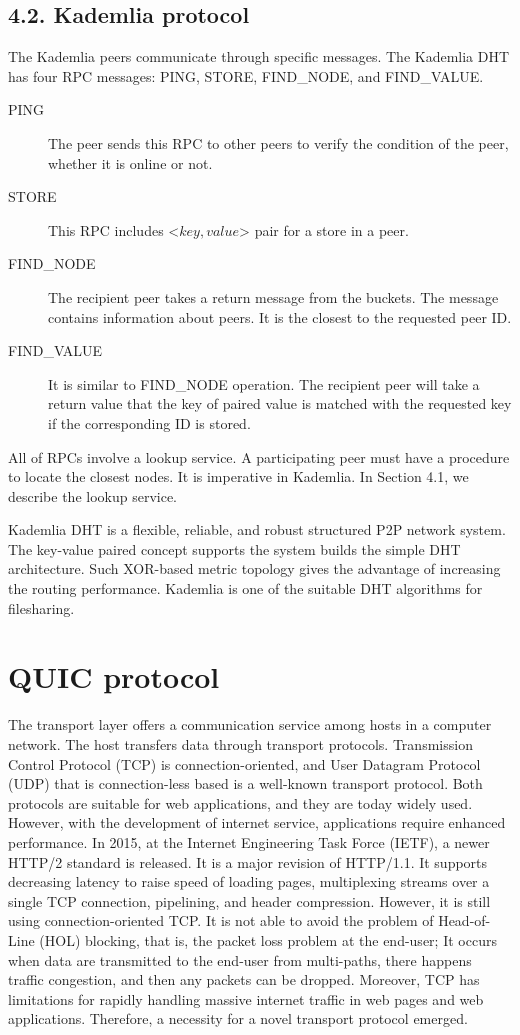 \subsection{4.2.	Kademlia protocol}

The Kademlia peers communicate through specific messages. The Kademlia DHT has four RPC messages: PING, STORE, FIND\_NODE, and FIND\_VALUE.

\begin{description}
	\item[PING ] The peer sends this RPC to other peers to verify the condition of the peer, whether it is online or not.
	\item[STORE] This RPC includes <$key, value$> pair for a store in a peer.
	\item[FIND\_NODE] The recipient peer takes a return message from the buckets. The message contains information about peers. It is the closest to the requested peer ID.
	\item[FIND\_VALUE] It is similar to FIND\_NODE operation. The recipient peer will take a return value that the key of paired value is matched with the requested key if the corresponding ID is stored.
\end{description}

All of RPCs involve a lookup service. A participating peer must have a procedure to locate the closest nodes. It is imperative in Kademlia. In Section 4.1, we describe the lookup service.

Kademlia DHT is a flexible, reliable, and robust structured P2P network system. The key-value paired concept supports the system builds the simple DHT architecture. Such XOR-based metric topology gives the advantage of increasing the routing performance. Kademlia is one of the suitable DHT algorithms for filesharing.

\section{QUIC protocol}

The transport layer offers a communication service among hosts in a computer network. The host transfers data through transport protocols. Transmission Control Protocol (TCP) is connection-oriented, and User Datagram Protocol (UDP) that is connection-less based is a well-known transport protocol. Both protocols are suitable for web applications, and they are today widely used. However, with the development of internet service, applications require enhanced performance. In 2015, at the Internet Engineering Task Force (IETF), a newer HTTP/2 standard is released. It is a major revision of HTTP/1.1. It supports decreasing latency to raise speed of loading pages, multiplexing streams over a single TCP connection, pipelining, and header compression. However, it is still using connection-oriented TCP. It is not able to avoid the problem of Head-of-Line (HOL) blocking, that is, the packet loss problem at the end-user; It occurs when data are transmitted to the end-user from multi-paths, there happens traffic congestion, and then any packets can be dropped. Moreover, TCP has limitations for rapidly handling massive internet traffic in web pages and web applications. Therefore, a necessity for a novel transport protocol emerged. 

